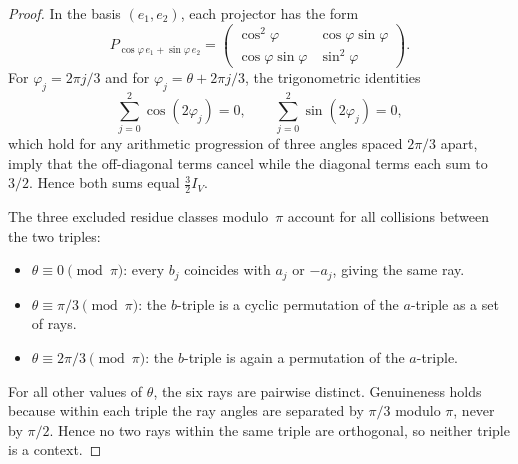 \documentclass[
  twocolumn,
  aps,
  pra,
  floatfix,
  amsmath,amssymb,
  longbibliography
]{revtex4-2}
\theoremstyle{definition}
\theoremstyle{remark}
\begin{document}
\begin{proof}
In the basis $(e_1,e_2)$, each projector has the form
\[
  P_{\cos\varphi\,e_1+\sin\varphi\,e_2}
  =\begin{pmatrix}\cos^2\!\varphi&\cos\varphi\sin\varphi\\
                  \cos\varphi\sin\varphi&\sin^2\!\varphi\end{pmatrix}.
\]
For $\varphi_j=2\pi j/3$ and for $\varphi_j=\theta+2\pi j/3$, the
trigonometric identities
\[
  \sum_{j=0}^{2}\cos(2\varphi_j)=0,\qquad
  \sum_{j=0}^{2}\sin(2\varphi_j)=0,
\]
which hold for any arithmetic progression of three angles spaced
$2\pi/3$ apart, imply that the off-diagonal terms cancel while the
diagonal terms each sum to $3/2$.  Hence both sums equal
$\frac{3}{2}I_V$.

The three excluded residue classes modulo~$\pi$ account for all
collisions between the two triples:
\begin{itemize}
  \item $\theta\equiv 0\pmod{\pi}$: every $b_j$ coincides with $a_j$
        or $-a_j$, giving the same ray.
  \item $\theta\equiv\pi/3\pmod{\pi}$: the $b$-triple is a cyclic
        permutation of the $a$-triple as a set of rays.
  \item $\theta\equiv 2\pi/3\pmod{\pi}$: the $b$-triple is again a
        permutation of the $a$-triple.
\end{itemize}
For all other values of $\theta$, the six rays are pairwise distinct.
Genuineness holds because within each triple the ray angles are separated by \( \pi/3 \) modulo \(\pi\), never by \(\pi/2\). Hence no two rays within the same triple are orthogonal, so neither triple is a context.
\end{proof}
\end{document}
